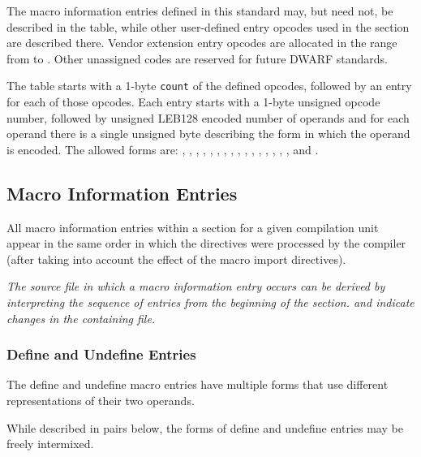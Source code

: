 \begin{enumerate}[1. ]
The macro information entries defined in this standard may, but need not, be
described in the table, while other user-defined entry opcodes used in the section
are described there.  Vendor extension entry opcodes are
allocated in the range from \DWMACROlouser{} to \DWMACROhiuser. Other
unassigned codes are reserved for future DWARF standards.

The table starts with a 1-byte \texttt{count} of the defined opcodes, followed by
an entry for each of those opcodes.  Each entry starts with a 1-byte unsigned
opcode number, followed by unsigned LEB128 encoded number of operands
and for each operand there is a single unsigned byte describing the form in which
the operand is encoded.  The allowed forms are: 
\DWFORMblock, \DWFORMblockone, \DWFORMblocktwo, \DWFORMblockfour,
\DWFORMdataone, \DWFORMdatatwo, \DWFORMdatafour, \DWFORMdataeight, 
\DWFORMdatasixteen,  
\DWFORMflag, \DWFORMlinestrp, \DWFORMsdata, 
\DWFORMsecoffset, \DWFORMstring, \DWFORMstrp{}, 
\DWFORMstrpsup, \DWFORMstrxXN{} and \DWFORMudata.
\end{enumerate}

\subsection{Macro Information Entries}
\label{chap:macroinformationentries}
All macro information entries within a \dotdebugmacro{}
section for a given compilation unit appear in the same 
order in which the directives were processed by the 
compiler (after taking into account the effect of the
macro import directives).

\textit{The source file in which a macro information entry occurs
can be derived by interpreting the sequence of entries from the
beginning of the \dotdebugmacro{} section. \DWMACROstartfile{} and 
\DWMACROendfile{} indicate changes in the containing file.} 

\subsubsection{Define and Undefine Entries}
\label{chap:defineandundefineentries}
The define and undefine macro entries have multiple forms that
use different representations of their two operands.

While described in pairs below, the forms of define 
and undefine entries may be freely intermixed.

